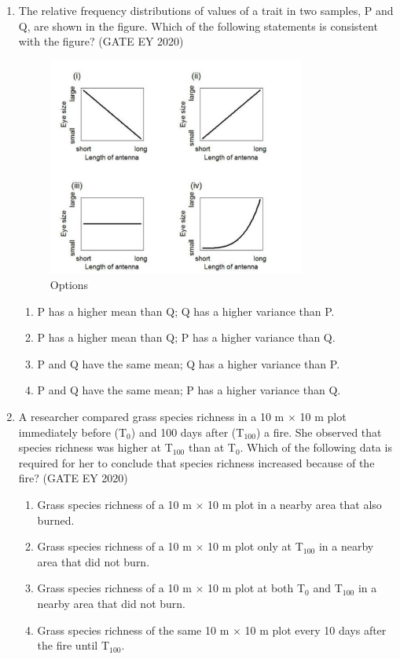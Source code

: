 \begin{enumerate}
\item
The relative frequency distributions of values of a trait in two samples, P and Q, are shown in the figure. Which of the following statements is consistent with the figure? \hfill {(GATE EY 2020)}


\begin{figure}[H]
\centering
    \includegraphics[width=0.8\textwidth]{figs/fig13.png}
\caption{Options}
\label{fig:q49}
\end{figure}


\begin{multicols}{2}
\begin{enumerate}
\item P has a higher mean than Q; Q has a higher variance than P.
\item P has a higher mean than Q; P has a higher variance than Q.
\item P and Q have the same mean; Q has a higher variance than P.
\item P and Q have the same mean; P has a higher variance than Q.
\end{enumerate}
\end{multicols}
\item
A researcher compared grass species richness in a 10 m $\times$ 10 m plot immediately before (T$_0$) and 100 days after (T$_{100}$) a fire. She observed that species richness was higher at T$_{100}$ than at T$_0$. Which of the following data is required for her to conclude that species richness increased because of the fire? \hfill {(GATE EY 2020)}
\begin{multicols}{2}
\begin{enumerate}
\item Grass species richness of a 10 m $\times$ 10 m plot in a nearby area that also burned.
\item Grass species richness of a 10 m $\times$ 10 m plot only at T$_{100}$ in a nearby area that did not burn.
\item Grass species richness of a 10 m $\times$ 10 m plot at both T$_0$ and T$_{100}$ in a nearby area that did not burn.
\item Grass species richness of the same 10 m $\times$ 10 m plot every 10 days after the fire until T$_{100}$.
\end{enumerate}
\end{multicols}


\end{enumerate}
